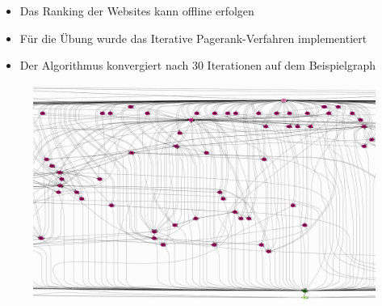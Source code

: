 \begin{frame}[c]
\begin{itemize}
  \item Das Ranking der Websites kann offline erfolgen
  \item Für die Übung wurde das Iterative Pagerank-Verfahren implementiert
  \item Der Algorithmus konvergiert nach 30 Iterationen auf dem Beispielgraph
\end{itemize}
\end{frame}

\begin{frame}[c]
\begin{figure}[htp]
\begin{center}
  \includegraphics[height=1\textheight]{graphics/pr_overview.png}
  \caption[labelInTOC]{}
  \label{fig:prOverview} 
\end{center}
\end{figure}
\end{frame}

